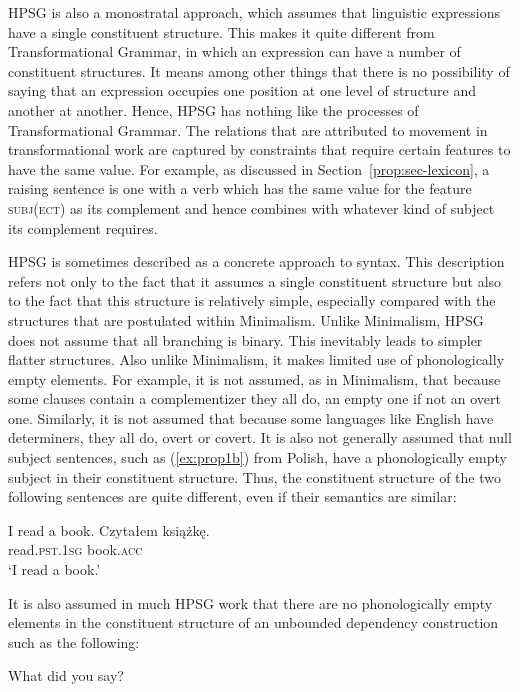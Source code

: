 \documentclass[output=paper
	        ,collection
	        ,collectionchapter
 	        ,biblatex
                ,babelshorthands
                ,newtxmath
                ,draftmode
                ,colorlinks, citecolor=brown
]{langscibook}
\begin{document}
HPSG is also a monostratal approach, which assumes that linguistic expressions have a single constituent structure. This makes it quite different from Transformational Grammar, in which an expression can have a number of constituent structures. It means among other things that there is no possibility of saying that an expression occupies one position at one level of structure and another at another. Hence, HPSG has nothing like the  processes of Transformational Grammar. The relations that are attributed to movement in transformational work are captured by constraints that require certain features to have the same value. For example, as discussed in Section~\ref{prop:sec-lexicon}, a raising sentence is one with a verb which has the same value for the feature \textsc{subj(ect)} as its complement and hence combines with whatever kind of subject its complement requires.

HPSG is sometimes described as a concrete approach to syntax. This description refers not only to
the fact that it assumes a single constituent structure but also to the fact that this structure is
relatively simple, especially compared with the structures that are postulated within
Minimalism\indexmp. Unlike Minimalism, HPSG does not assume that all branching
is binary. This inevitably leads to simpler flatter structures. Also unlike Minimalism, it makes
limited use of phonologically empty elements. For example, it is not assumed, as in Minimalism, that
because some clauses contain a complementizer they all do, an empty one if not an overt
one. Similarly, it is not assumed that because some languages like English have determiners, they
all do, overt or covert. It is also not generally assumed that null subject sentences, such as
(\ref{ex:prop1b}) from Polish, have a phonologically empty subject in their constituent
structure. Thus, the constituent structure of the two following sentences are quite different, even
if their semantics are similar:

\eal\label{ex:prop1}
\ex\label{ex:prop1a}
I read a book.
\ex\label{ex:prop1b}
\gll Czytałem książkę.\\
     read\textsc{.pst.1sg} book\textsc{.acc}\\
\glt `I read a book.'
\zl

\noindent
It is also assumed in much HPSG work that there are no phonologically empty elements in the
constituent structure of an unbounded dependency construction such as the following:

\ea\label{ex:prop2}
What did you say?
\z
\end{document}
